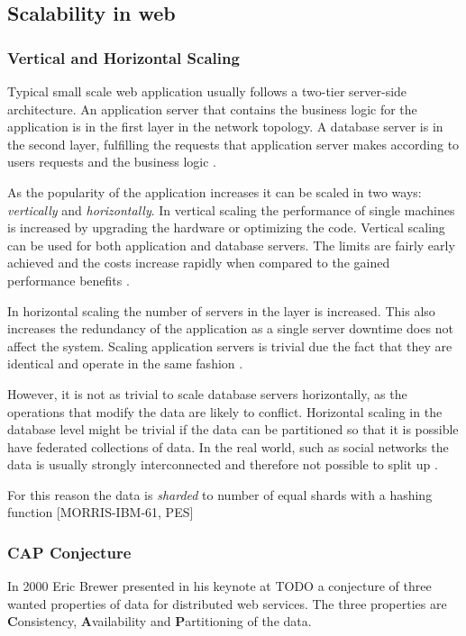 \documentclass{tktltiki}
\begin{document}
\subsection{Scalability in web}

\subsubsection{Vertical and Horizontal Scaling}

Typical small scale web application usually follows a two-tier server-side architecture. An application server that contains the business logic for the application is in the first layer in the network topology.  A database server is in the second layer, fulfilling the requests that application server makes according to users requests and the business logic \cite{PES10}.

As the popularity of the application increases it can be scaled in two ways: \emph{vertically} and \emph{horizontally}.  In vertical scaling the performance of single machines is increased by upgrading the hardware or optimizing the code.  Vertical scaling can be used for both application and database servers.  The limits are fairly early achieved and the costs increase rapidly when compared to the gained performance benefits \cite{PES10}.

In horizontal scaling the number of servers in the layer is increased.  This also increases the redundancy of the application as a single server downtime does not affect the system.  Scaling application servers is trivial due the fact that they are identical and operate in the same fashion \cite{PES10}.

However, it is not as trivial to scale database servers horizontally, as the operations that modify the data are likely to conflict.  Horizontal scaling in the database level might be trivial if the data can be partitioned so that it is possible have federated collections of data.  In the real world, such as social networks the data is usually strongly interconnected and therefore not possible to split up \cite{PES10}.

For this reason the data is \emph{sharded} to number of equal shards with a hashing function [MORRIS-IBM-61, PES]


\subsubsection{CAP Conjecture}

In 2000 Eric Brewer presented in his keynote at TODO \cite{Bre02} a conjecture of three wanted properties of data for distributed web services.  The three properties are \textbf{C}onsistency, \textbf{A}vailability and \textbf{P}artitioning of the data.
\end{document}
